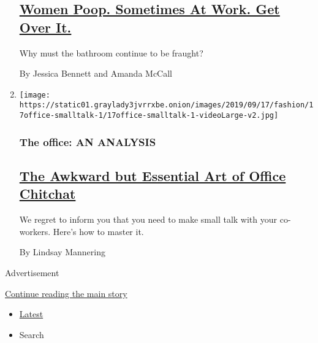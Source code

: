 \begin{enumerate}
  \hypertarget{women-poop-sometimes-at-work-get-over-it}{%
  \subsection{\texorpdfstring{\href{/2019/09/17/style/women-poop-at-work.html}{Women
  Poop. Sometimes At Work. Get Over
  It.}}{Women Poop. Sometimes At Work. Get Over It.}}\label{women-poop-sometimes-at-work-get-over-it}}

  Why must the bathroom continue to be fraught?

  By Jessica Bennett and Amanda McCall
\item
  \texttt{[image: https://static01.graylady3jvrrxbe.onion/images/2019/09/17/fashion/17office-smalltalk-1/17office-smalltalk-1-videoLarge-v2.jpg]}

  \hypertarget{the-office-an-analysis-3}{%
  \subsubsection{The office: AN
  ANALYSIS}\label{the-office-an-analysis-3}}

  \hypertarget{the-awkward-but-essential-art-of-office-chitchat}{%
  \subsection{\texorpdfstring{\href{/2019/09/17/style/the-awkward-art-of-office-small-talk.html}{The
  Awkward but Essential Art of Office
  Chitchat}}{The Awkward but Essential Art of Office Chitchat}}\label{the-awkward-but-essential-art-of-office-chitchat}}

  We regret to inform you that you need to make small talk with your
  co-workers. Here's how to master it.

  By Lindsay Mannering
\end{enumerate}

Advertisement

\protect\hyperlink{after-mid1}{Continue reading the main story}

\begin{itemize}
\tightlist
\item
  \protect\hyperlink{stream-panel}{Latest}
\item
  Search
\end{itemize}

